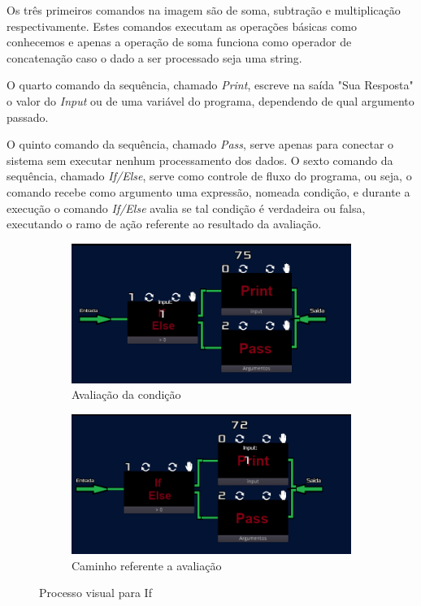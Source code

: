 Os três primeiros comandos na imagem são de soma, subtração e multiplicação
respectivamente. Estes comandos executam as operações básicas como conhecemos e
apenas a operação de soma funciona como operador de concatenação caso o dado a
ser processado seja uma string.

O quarto comando da sequência, chamado \textit{Print}, escreve na saída 
"Sua Resposta" o valor do \textit{Input} ou de uma variável do programa,
dependendo de qual argumento passado.

O quinto comando da sequência, chamado \textit{Pass}, serve apenas para conectar
o sistema sem executar nenhum processamento dos dados.
O sexto comando da sequência, chamado \textit{If/Else}, serve como controle de 
fluxo do programa, ou seja, o comando recebe como argumento uma expressão, 
nomeada condição, e durante a execução o comando \textit{If/Else} avalia se 
tal condição é verdadeira ou falsa, executando o ramo de ação referente ao 
resultado da avaliação.

\begin{figure}[H]
    \centering
    \begin{subfigure}{0.48\textwidth}
        \centering
        \includegraphics[width=1\textwidth]{../figuras/avaliacao_if.png}
        \caption{Avaliação da condição}
    \end{subfigure}
    \begin{subfigure}{0.48\textwidth}
        \centering
        \includegraphics[width=1\textwidth]{../figuras/caminho_if.png}
        \caption{Caminho referente a avaliação}
    \end{subfigure}  
    \caption{Processo visual para If}
\end{figure}

